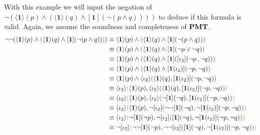 \begin{example}\label{Open ft tableau}
With this example we will input the negation of $\neg(\langle \textbf{1} \rangle (p) \wedge (\langle\textbf{1}\rangle (q) \wedge [\textbf{1}](\neg(p \wedge q))))$ to deduce if this formula is valid. Again, we assume the soundness and completeness of $\textbf{PMT}$.
\begin{align*}
    \neg\neg(\langle \textbf{1} \rangle (p) \wedge \tcr{(}\langle\textbf{1}\rangle (q) \wedge [\textbf{1}]\tcb{(}\neg(p \wedge q)\tcb{)}\tcr{)})
    &\equiv \langle \textbf{1} \rangle (p) \wedge \tcr{(}\langle\textbf{1}\rangle (q) \wedge [\textbf{1}]\tcb{(}\neg(p \wedge q)\tcb{)}\tcr{)}\\
    &\equiv \langle \textbf{1} \rangle (p) \wedge \tcr{(}\langle\textbf{1}\rangle (q) \wedge [\textbf{1}]\tcb{(}\neg p \vee \neg q\tcb{)}\tcr{)}\\
    &\equiv \langle \textbf{1} \rangle (p) \wedge \tcr{(}\langle\textbf{1}\rangle (q) \wedge [\textbf{1}]\tcb{(}[\iota_2](\neg p \coms \neg q)\tcb{)}\tcr{)}\\
    &\equiv \langle \textbf{1} \rangle (p) \wedge \tcr{(}\langle\textbf{1}\rangle (q) \wedge [\textbf{1}(\iota_2)]\tcb{(}\neg p, \neg q\tcb{)}\tcr{)}\\
    &\equiv \langle \textbf{1} \rangle (p) \wedge \langle \iota_2 \rangle\tcr{(}\langle\textbf{1}\rangle (q), [\textbf{1}(\iota_2)]\tcb{(}\neg p, \neg q\tcb{)}\tcr{)}\\
    &\equiv \langle \iota_2 \rangle\tcg{(}\langle \textbf{1} \rangle (p) , \langle \iota_2 \rangle\tcr{(}\langle\textbf{1}\rangle (q), [\textbf{1}(\iota_2)]\tcb{(}\neg p, \neg q\tcb{)}\tcr{)}\tcg{)}\\
    &\equiv \langle \iota_2 \rangle\tcg{(}\langle \textbf{1} \rangle (p) , \langle \iota_2 \rangle\tcr{(}\neg[\textbf{1}] (\neg q), [\textbf{1}(\iota_2)]\tcb{(}\neg p, \neg q\tcb{)}\tcr{)}\tcg{)}\\
    &\equiv \langle \iota_2 \rangle\tcg{(}\langle \textbf{1} \rangle (p) , \neg[\iota_2]\tcr{(}\neg\neg [\textbf{1}] (\neg q), \neg[\textbf{1}(\iota_2)]\tcb{(}\neg p, \neg q\tcb{)}\tcr{)}\tcg{)}\\
    &\equiv \langle \iota_2 \rangle\tcg{(}\neg[\textbf{1}] (\neg p) , \neg[\iota_2]\tcr{(} [\textbf{1}] (\neg q), \neg[\textbf{1}(\iota_2)]\tcb{(}\neg p, \neg q\tcb{)}\tcr{)}\tcg{)}\\
    &\equiv \neg[\iota_2] \tcg{(}\neg\neg[\textbf{1}] (\neg p) , \neg\neg[\iota_2]\tcr{(} [\textbf{1}] (\neg q), \neg[\textbf{1}(\iota_2)]\tcb{(}\neg p, \neg q\tcb{)}\tcr{)}\tcg{)}\\

\end{align*}
\end{example}
